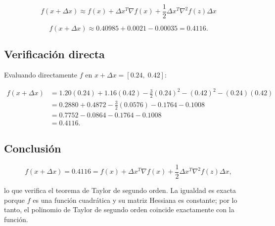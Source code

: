\documentclass[12pt]{article}
\begin{document}
\[
f(x + \Delta x) \approx f(x) + \Delta x^T \nabla f(x) + \frac{1}{2} \Delta x^T \nabla^2 f(z) \Delta x
\]

\[
f(x + \Delta x) \approx 0.40985 + 0.0021 - 0.00035 = 0.4116.
\]

\subsection{Verificación directa}

Evaluando directamente \(f\) en \(x + \Delta x = [0.24,\; 0.42]\):

\begin{align*}
f(x + \Delta x) &= 1.20(0.24) + 1.16(0.42) - \frac{3}{2}(0.24)^2 - (0.42)^2 - (0.24)(0.42) \\
&= 0.2880 + 0.4872 - \frac{3}{2}(0.0576) - 0.1764 - 0.1008 \\
&= 0.7752 - 0.0864 - 0.1764 - 0.1008 \\
&= 0.4116.
\end{align*}

\subsection{Conclusión}

\[
f(x + \Delta x) = 0.4116 = f(x) + \Delta x^T \nabla f(x) + \frac{1}{2} \Delta x^T \nabla^2 f(z) \Delta x,
\]

lo que verifica el teorema de Taylor de segundo orden. La igualdad es exacta porque
\(f\) es una función cuadrática y su matriz Hessiana es constante; por lo tanto,
el polinomio de Taylor de segundo orden coincide exactamente con la función.
\end{document}
